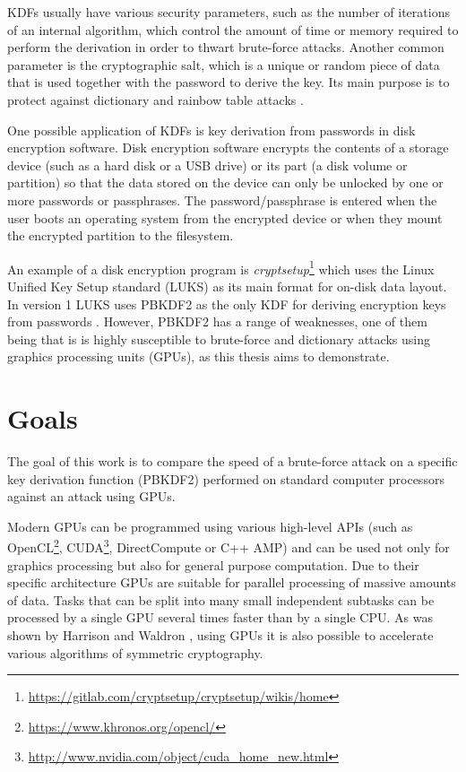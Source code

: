 \documentclass[12pt,oneside]{fithesis2}
\begin{document}
      KDFs usually have various security parameters, such as the number of iterations of an internal algorithm, which control the amount of time or memory required to perform the derivation in order to thwart brute-force attacks. Another common parameter is the cryptographic salt, which is a unique or random piece of data that is used together with the password to derive the key. Its main purpose is to protect against dictionary and rainbow table attacks \cite[section 4.1]{rfc2898}.
      
      \sloppy
      One possible application of KDFs is key derivation from passwords in disk encryption software. Disk encryption software encrypts the contents of a storage device (such as a hard disk or a USB drive) or its part (a disk volume or partition) so that the data stored on the device can only be unlocked by one or more passwords or passphrases. The password/passphrase is entered when the user boots an operating system from the encrypted device or when they mount the encrypted partition to the filesystem.
      
      An example of a disk encryption program is \emph{cryptsetup}\footnote{\url{https://gitlab.com/cryptsetup/cryptsetup/wikis/home}} which uses the Linux Unified Key Setup standard (LUKS) as its main format for on-disk data layout. In version 1 LUKS uses PBKDF2 as the only KDF for deriving encryption keys from passwords \cite{luks}. However, PBKDF2 has a range of weaknesses, one of them being that is is highly susceptible to brute-force and dictionary attacks using graphics processing units (GPUs), as this thesis aims to demonstrate.
    
      \section{Goals}
      The goal of this work is to compare the speed of a brute-force attack on a specific key derivation function (PBKDF2) performed on standard computer processors against an attack using GPUs.
      
      Modern GPUs can be programmed using various high-level APIs (such as OpenCL\footnote{\url{https://www.khronos.org/opencl/}}, CUDA\footnote{\url{http://www.nvidia.com/object/cuda_home_new.html}}, DirectCompute or C++ AMP) and can be used not only for graphics processing but also for general purpose computation. Due to their specific architecture GPUs are suitable for parallel processing of massive amounts of data. Tasks that can be split into many small independent subtasks can be processed by a single GPU several times faster than by a single CPU. As was shown by Harrison and Waldron \cite{Harrison}, using GPUs it is also possible to accelerate various algorithms of symmetric cryptography.
    
\end{document}
